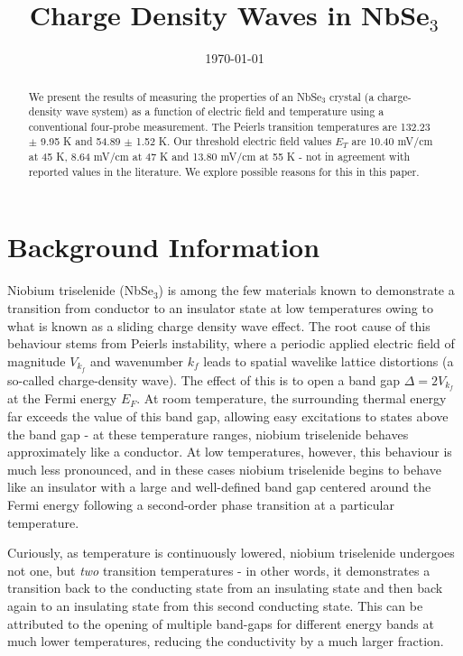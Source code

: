 \documentclass[aps,prl,nofootinbib,twocolumn,superscriptaddress,groupedaddress]{revtex4}  %
\begin{document}
\title{Charge Density Waves in NbSe$_{3}$}
\date{\today}

\begin{abstract}
We present the results of measuring the properties of an NbSe$_{3}$ crystal (a charge-density wave system) as a function of electric field and temperature using a conventional four-probe measurement. The Peierls transition temperatures are 132.23 $\pm$ 9.95 K and 54.89 $\pm$ 1.52 K. Our threshold electric field values $E_{T}$ are 10.40 mV/cm at 45 K, 8.64 mV/cm at 47 K and 13.80 mV/cm at 55 K - not in agreement with reported values in the literature. We explore possible reasons for this in this paper.
\end{abstract}

\maketitle

\section{Background Information}

Niobium triselenide (NbSe$_{3}$) is among the few materials known to demonstrate a transition from conductor to an insulator state at low temperatures owing to what is known as a sliding charge density wave effect. The root cause of this behaviour stems from Peierls instability, where a periodic applied electric field of magnitude $V_{k_{f}}$ and wavenumber $k_{f}$ leads to spatial wavelike lattice distortions (a so-called charge-density wave). The effect of this is to open a band gap $\Delta = 2 V_{k_{f}}$ at the Fermi energy $E_{F}$. At room temperature, the surrounding thermal energy far exceeds the value of this band gap, allowing easy excitations to states above the band gap - at these temperature ranges, niobium triselenide behaves approximately like a conductor. At low temperatures, however, this behaviour is much less pronounced, and in these cases niobium triselenide begins to behave like an insulator with a large and well-defined band gap centered around the Fermi energy following a second-order phase transition at a particular temperature.

Curiously, as temperature is continuously lowered, niobium triselenide undergoes not one, but \textit{two} transition temperatures - in other words, it demonstrates a transition back to the conducting state from an insulating state and then back again to an insulating state from this second conducting state. This can be attributed to the opening of multiple band-gaps for different energy bands at much lower temperatures, reducing the conductivity by a much larger fraction.
\end{document}
